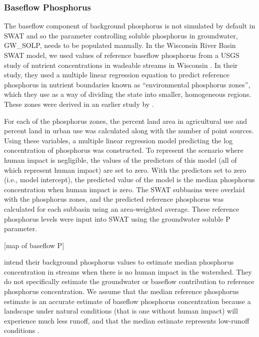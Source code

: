 \subsubsection{Baseflow Phosphorus}\label{sec:gwp}
	The baseflow component of background phosphorus is not simulated by default in SWAT and so the parameter controlling soluble phosphorus in groundwater, GW\_SOLP, needs to be populated manually. In the Wisconsin River Basin SWAT model, we used values of reference baseflow phosphorus from a USGS study of nutrient concentrations in wadeable streams in Wisconsin \citet{robertson_wadeable_2006}. In their study, they used a multiple linear regression equation to predict reference phosphorus in nutrient boundaries known as ``environmental phosphorus zones'', which they use as a way of dividing the state into smaller, homogeneous regions. These zones were derived in an earlier study by \citet{robertson_phosphoruszones_2006}.
	
	For each of the phosphorus zones, the percent land area in agricultural use and percent land in urban use was calculated along with the number of point sources. Using these variables, a multiple linear regression model predicting the log concentration of phosphorus was constructed. To represent the scenario where human impact is negligible, the values of the predictors of this model (all of which represent human impact) are set to zero. With the predictors set to zero (i.e., model intercept), the predicted value of the model is the median phosphorus concentration when human impact is zero. The SWAT subbasins were overlaid with the phosphorus zones, and the predicted reference phosphorus was calculated for each subbasin using an area-weighted average. These reference phosphorus levels were input into SWAT using the groundwater soluble P parameter.
	
	[map of baseflow P]
	
	\citet{robertson_wadeable_2006} intend their background phosphorus values to estimate median phosphorus concentration in streams when there is no human impact in the watershed. They do not specifically estimate the groundwater or baseflow contribution to reference phosphorus concentration. We assume that the median reference phosphorus estimate is an accurate estimate of baseflow phosphorus concentration because a landscape under natural conditions (that is one without human impact) will experience much less runoff, and that the median estimate represents low-runoff conditions .
	
	
	
	
